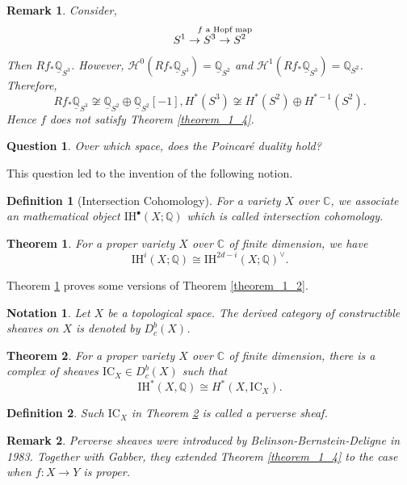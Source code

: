 \documentclass[8pt]{article}
\numberwithin{equation}{section}
\newtheorem{theorem}{Theorem} [section]
\newtheorem{definition}{Definition}[section]
\newtheorem{notation}{Notation}[section]
\newtheorem{remark}{Remark}[section]
\newtheorem*{question}{Question}
\newcommand{\C}[0]{\mathbb{C}}
\newcommand{\Q}[0]{\mathbb{Q}}
\newcommand{\IH}[0]{\mathrm{IH}}
\newcommand{\IC}[0]{\mathrm{IC}}
\begin{document}
\begin{remark}
    Consider,
    \begin{equation*}
        S^1\to S^3\stackrel{\substack{ \text{\makebox[0pt][c]{$f$ a Hopf map}}\\\:}}{\to} S^2
    \end{equation*}
    Then $Rf_*\underline{\Q}_{S^3}$. However, $\mathcal{H}^0(Rf_*\underline{\Q}_{S^3}) = \underline{\Q}_{S^2}$ and $\mathcal{H}^1(Rf_*\underline{\Q}_{S^3}) = \Q_{S^2}$. Therefore,
    \begin{equation*}
        Rf_*\underline{\Q}_{S^3}\not\cong \underline{\Q}_{S^2}\oplus\underline{\Q}_{S^2}[-1], H^*(S^3)\not\cong H^*(S^2)\oplus H^{*-1}(S^2).
    \end{equation*}
    Hence $f$ does not satisfy Theorem \ref{theorem_1_4}.
\end{remark}
\begin{question}
Over which space, does the Poincaré duality hold?
\end{question}
This question led to the invention of the following notion.
\begin{definition}[Intersection Cohomology]
    \label{definition_1_3}
    For a variety $X$ over $\C$, we associate an mathematical object $\IH^\bullet(X;\Q)$ which is called intersection cohomology.
\end{definition}

\begin{theorem}
    \label{theorem_1_5}
    For a proper variety $X$ over $\C$ of finite dimension, we have
    \begin{equation*}
        \IH^i(X;\Q)\cong \IH^{2d-i}(X;\Q)^\vee.
    \end{equation*}
\end{theorem} 

Theorem \ref{theorem_1_5} proves some versions of Theorem \ref{theorem_1_2}.
\begin{notation}
    Let $X$ be a topological space. The derived category of constructible sheaves on $X$ is denoted by $D^b_c(X)$.
\end{notation}
\begin{theorem}
    \label{theorem_1_6}
    For a proper variety $X$ over $\C$ of finite dimension, there is a complex of sheaves $\IC_X\in D^b_c(X)$ such that%
\begin{equation*}
    \IH^*(X,\Q) \cong H^*(X,\IC_X).
\end{equation*}
\end{theorem}
\begin{definition}
    Such $\IC_X$ in Theorem \ref{theorem_1_6} is called a perverse sheaf.
\end{definition}
\begin{remark}
    Perverse sheaves were introduced by Belinson-Bernstein-Deligne in 1983. Together with Gabber, they extended Theorem \ref{theorem_1_4} to the case when $f:X\to Y$ is proper.
\end{remark}
\end{document}
